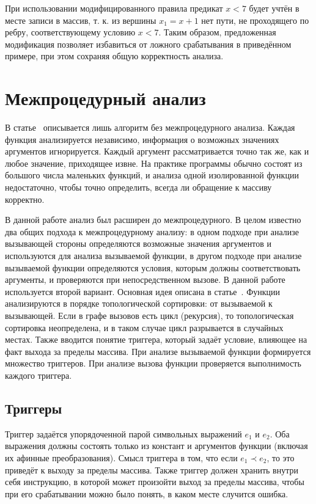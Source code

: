 При использовании модифицированного правила предикат $x < 7$ будет
учтён в месте записи в массив, т. к. из вершины $x_1 = x + 1$ нет
пути, не проходящего по ребру, соответствующему условию $x < 7$. Таким
образом, предложенная модификация позволяет избавиться от ложного
срабатывания в приведённом примере, при этом сохраняя общую
корректность анализа.

\FloatBarrier

\section{Межпроцедурный анализ}

В статье~\cite{li2010practical} описывается лишь алгоритм без
межпроцедурного анализа. Каждая функция анализируется независимо,
информация о возможных значениях аргументов игнорируется. Каждый
аргумент рассматривается точно так же, как и любое значение,
приходящее извне. На практике программы обычно состоят из большого
числа маленьких функций, и анализа одной изолированной функции
недостаточно, чтобы точно определить, всегда ли обращение к массиву
корректно.

В данной работе анализ был расширен до межпроцедурного. В целом
известно два общих подхода к межпроцедурному анализу: в одном подходе
при анализе вызывающей стороны определяются возможные значения
аргументов и используются для анализа вызываемой функции, в другом
подходе при анализе вызываемой функции определяются условия, которым
должны соответствовать аргументы, и проверяются при непосредственном
вызове. В данной работе используется второй вариант. Основная идея
описана в статье~\cite{xie2003archer}. Функции анализируются в порядке
топологической сортировки: от вызываемой к вызывающей. Если в графе
вызовов есть цикл (рекурсия), то топологическая сортировка
неопределена, и в таком случае цикл разрывается в случайных
местах. Также вводится понятие триггера, который задаёт условие,
влияющее на факт выхода за пределы массива. При анализе вызываемой
функции формируется множество триггеров. При анализе вызова функции
проверяется выполнимость каждого триггера.

\subsection{Триггеры}

Триггер задаётся упорядоченной парой символьных выражений $e_1$ и
$e_2$. Оба выражения должны состоять только из констант и аргументов
функции (включая их афинные преобразования). Смысл триггера в том, что
если $e_1 \prec e_2$, то это приведёт к выходу за пределы
массива. Также триггер должен хранить внутри себя инструкцию, в
которой может произойти выход за пределы массива, чтобы при его
срабатывании можно было понять, в каком месте случится ошибка.

